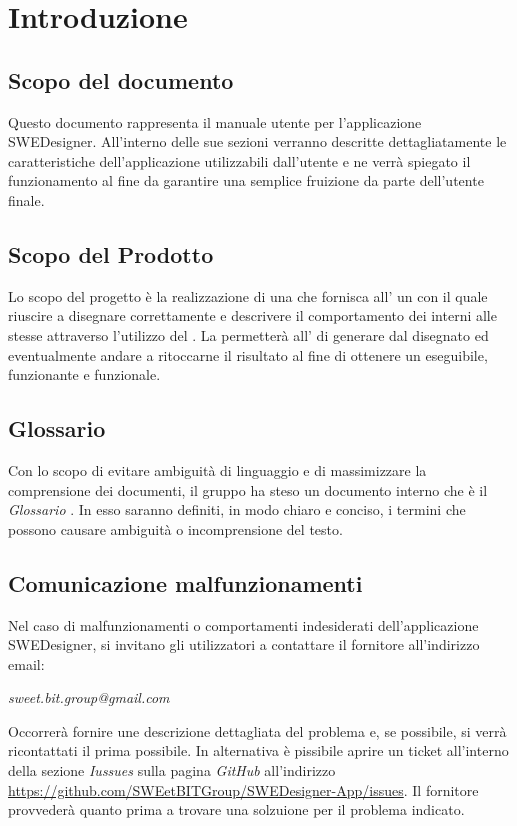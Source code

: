 \section{Introduzione}
  \subsection{Scopo del documento}
          Questo documento rappresenta il manuale utente per l'applicazione SWEDesigner.
          All'interno delle sue sezioni verranno descritte dettagliatamente le caratteristiche dell'applicazione utilizzabili dall'utente e ne verrà spiegato il funzionamento
          al fine da garantire una semplice fruizione da parte dell'utente finale.
  \subsection{Scopo del Prodotto}
          Lo scopo del progetto è la realizzazione di una  che fornisca all' un   con il quale riuscire a disegnare correttamente 
          e descrivere il comportamento dei  interni alle stesse attraverso l'utilizzo del .
          La  permetterà all' di generare   dal  disegnato ed eventualmente andare a ritoccarne il risultato al fine di ottenere un 
          eseguibile, funzionante e funzionale.
  \subsection{Glossario}
          Con lo scopo di evitare ambiguità di linguaggio e di massimizzare la comprensione dei documenti, il
          gruppo ha steso un documento interno che è il \emph{Glossario \VersioneG{}}. In esso saranno definiti, in modo
          chiaro e conciso, i termini che possono causare ambiguità o incomprensione del testo.
  \subsection{Comunicazione malfunzionamenti}
  Nel caso di malfunzionamenti o comportamenti indesiderati dell'applicazione SWEDesigner, si invitano gli utilizzatori a contattare il fornitore all'indirizzo email:\\
  \begin{center}
  \emph{sweet.bit.group@gmail.com}
  \end{center}
Occorrerà fornire une descrizione dettagliata del problema e, se possibile, si verrà ricontattati il prima possibile.
In alternativa è pissibile aprire un ticket all'interno della sezione \emph{Iussues} sulla pagina \emph{GitHub} all'indirizzo \url{https://github.com/SWEetBITGroup/SWEDesigner-App/issues}. Il fornitore provvederà quanto prima
a trovare una solzuione per il problema indicato.
